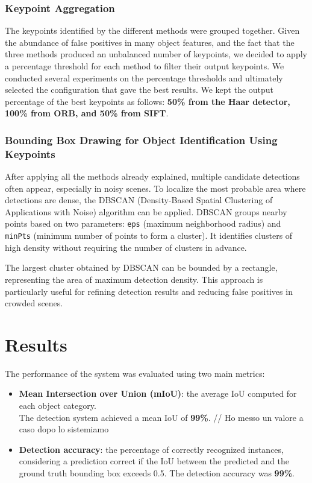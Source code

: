 \documentclass[10.5pt,a4paper]{article}
\begin{document}
\subsubsection*{Keypoint Aggregation}
The keypoints identified by the different methods were grouped together. Given the abundance of false positives in many object features, and the fact that the three methods produced an unbalanced number of keypoints, we decided to apply a percentage threshold for each method to filter their output keypoints. We conducted several experiments on the percentage thresholds and ultimately selected the configuration that gave the best results. We kept the output percentage of the best keypoints as follows: \textbf{50\% from the Haar detector, 100\% from ORB, and 50\% from SIFT}.

\subsubsection*{Bounding Box Drawing for Object Identification Using Keypoints}
After applying all the methods already explained, multiple candidate detections often appear, especially in noisy scenes. To localize the most probable area where detections are dense, the DBSCAN (Density-Based Spatial Clustering of Applications with Noise) algorithm can be applied. DBSCAN groups nearby points based on two parameters: \texttt{eps} (maximum neighborhood radius) and \texttt{minPts} (minimum number of points to form a cluster). It identifies clusters of high density without requiring the number of clusters in advance.

The largest cluster obtained by DBSCAN can be bounded by a rectangle, representing the area of maximum detection density. This approach is particularly useful for refining detection results and reducing false positives in crowded scenes.

\section*{Results}
The performance of the system was evaluated using two main metrics:
\begin{itemize}
    \item \textbf{Mean Intersection over Union (mIoU)}: the average IoU computed for each object category. \\The detection system achieved a mean IoU of \textbf{99\%}.  // Ho messo un valore a caso dopo lo sistemiamo
    \item \textbf{Detection accuracy}: the percentage of correctly recognized instances, considering a prediction correct if the IoU between the predicted and the ground truth bounding box exceeds 0.5. The detection accuracy was \textbf{99\%}.
\end{itemize}
\end{document}
